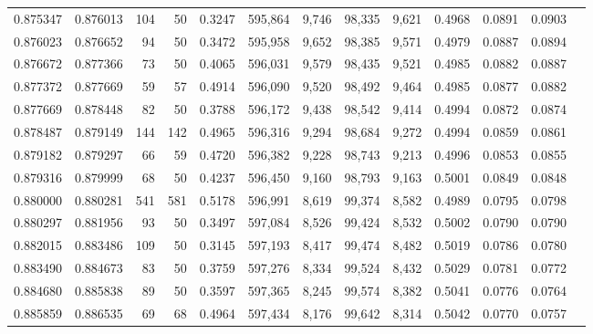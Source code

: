 \begin{tabular}{rrrrrrrrrrrrr}
0.875347 & 0.876013 &   104 &  50 &                                     0.3247 & 595,864 &   9,746 &  98,335 &   9,621 & 0.4968 & 0.0891 & 0.0903 \\
0.876023 & 0.876652 &    94 &  50 &                                     0.3472 & 595,958 &   9,652 &  98,385 &   9,571 & 0.4979 & 0.0887 & 0.0894 \\
0.876672 & 0.877366 &    73 &  50 &                                     0.4065 & 596,031 &   9,579 &  98,435 &   9,521 & 0.4985 & 0.0882 & 0.0887 \\
0.877372 & 0.877669 &    59 &  57 &                                     0.4914 & 596,090 &   9,520 &  98,492 &   9,464 & 0.4985 & 0.0877 & 0.0882 \\
0.877669 & 0.878448 &    82 &  50 &                                     0.3788 & 596,172 &   9,438 &  98,542 &   9,414 & 0.4994 & 0.0872 & 0.0874 \\
0.878487 & 0.879149 &   144 & 142 &                                     0.4965 & 596,316 &   9,294 &  98,684 &   9,272 & 0.4994 & 0.0859 & 0.0861 \\
0.879182 & 0.879297 &    66 &  59 &                                     0.4720 & 596,382 &   9,228 &  98,743 &   9,213 & 0.4996 & 0.0853 & 0.0855 \\
0.879316 & 0.879999 &    68 &  50 &                                     0.4237 & 596,450 &   9,160 &  98,793 &   9,163 & 0.5001 & 0.0849 & 0.0848 \\
0.880000 & 0.880281 &   541 & 581 &                                     0.5178 & 596,991 &   8,619 &  99,374 &   8,582 & 0.4989 & 0.0795 & 0.0798 \\
0.880297 & 0.881956 &    93 &  50 &                                     0.3497 & 597,084 &   8,526 &  99,424 &   8,532 & 0.5002 & 0.0790 & 0.0790 \\
0.882015 & 0.883486 &   109 &  50 &                                     0.3145 & 597,193 &   8,417 &  99,474 &   8,482 & 0.5019 & 0.0786 & 0.0780 \\
0.883490 & 0.884673 &    83 &  50 &                                     0.3759 & 597,276 &   8,334 &  99,524 &   8,432 & 0.5029 & 0.0781 & 0.0772 \\
0.884680 & 0.885838 &    89 &  50 &                                     0.3597 & 597,365 &   8,245 &  99,574 &   8,382 & 0.5041 & 0.0776 & 0.0764 \\
0.885859 & 0.886535 &    69 &  68 &                                     0.4964 & 597,434 &   8,176 &  99,642 &   8,314 & 0.5042 & 0.0770 & 0.0757 \\

\end{tabular}
